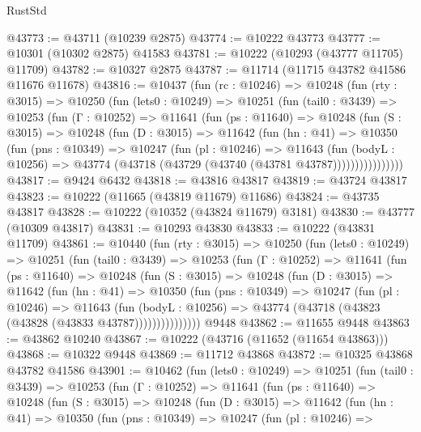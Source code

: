 \begin{lexlean}{RustStd}
\begin{coremodule}
@43773 := @43711 (@10239 @2875)
@43774 := @10222 @43773
@43777 := @10301 (@10302 @2875) @41583
@43781 := @10222 (@10293 (@43777 @11705) @11709)
@43782 := @10327 @2875
@43787 := @11714 (@11715 @43782 @41586 @11676 @11678)
@43816 := @10437
    (fun (rc : @10246) =>
    @10248
      (fun (rty : @3015) =>
      @10250
        (fun (lets0 : @10249) =>
        @10251
          (fun (tail0 : @3439) =>
          @10253
            (fun (Γ : @10252) =>
            @11641
              (fun (ps : @11640) =>
              @10248
                (fun (S : @3015) =>
                @10248
                  (fun (D : @3015) =>
                  @11642
                    (fun (hn : @41) =>
                    @10350
                      (fun (pns : @10349) =>
                      @10247
                        (fun (pl : @10246) =>
                        @11643
                          (fun (bodyL : @10256) =>
                          @43774 (@43718 (@43729 (@43740 (@43781 @43787))))))))))))))))
@43817 := @9424 @6432
@43818 := @43816 @43817
@43819 := @43724 @43817
@43823 := @10222 (@11665 (@43819 @11679) @11686)
@43824 := @43735 @43817
@43828 := @10222 (@10352 (@43824 @11679) @3181)
@43830 := @43777 (@10309 @43817)
@43831 := @10293 @43830
@43833 := @10222 (@43831 @11709)
@43861 := @10440
    (fun (rty : @3015) =>
    @10250
      (fun (lets0 : @10249) =>
      @10251
        (fun (tail0 : @3439) =>
        @10253
          (fun (Γ : @10252) =>
          @11641
            (fun (ps : @11640) =>
            @10248
              (fun (S : @3015) =>
              @10248
                (fun (D : @3015) =>
                @11642
                  (fun (hn : @41) =>
                  @10350
                    (fun (pns : @10349) =>
                    @10247
                      (fun (pl : @10246) =>
                      @11643
                        (fun (bodyL : @10256) =>
                        @43774 (@43718 (@43823 (@43828 (@43833 @43787)))))))))))))))
    @9448
@43862 := @11655 @9448
@43863 := @43862 @10240
@43867 := @10222 (@43716 (@11652 (@11654 @43863)))
@43868 := @10322 @9448
@43869 := @11712 @43868
@43872 := @10325 @43868 @43782 @41586
@43901 := @10462
    (fun (lets0 : @10249) =>
    @10251
      (fun (tail0 : @3439) =>
      @10253
        (fun (Γ : @10252) =>
        @11641
          (fun (ps : @11640) =>
          @10248
            (fun (S : @3015) =>
            @10248
              (fun (D : @3015) =>
              @11642
                (fun (hn : @41) =>
                @10350
                  (fun (pns : @10349) =>
                  @10247
                    (fun (pl : @10246) =>

\end{coremodule}
\end{lexlean}
